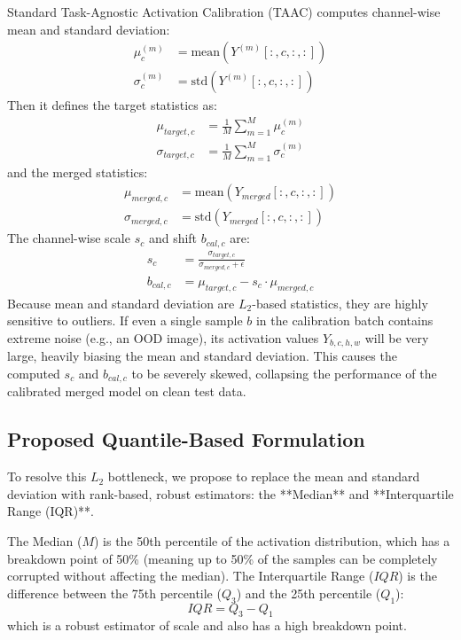 \documentclass{article}
\theoremstyle{plain}
\theoremstyle{definition}
\theoremstyle{remark}
\begin{document}
Standard Task-Agnostic Activation Calibration (TAAC) computes channel-wise mean and standard deviation:
\begin{align}
  \mu^{(m)}_c &= \text{mean}(Y^{(m)}[:, c, :, :]) \\
  \sigma^{(m)}_c &= \text{std}(Y^{(m)}[:, c, :, :])
\end{align}
Then it defines the target statistics as:
\begin{align}
  \mu_{target, c} &= \frac{1}{M} \sum_{m=1}^M \mu^{(m)}_c \\
  \sigma_{target, c} &= \frac{1}{M} \sum_{m=1}^M \sigma^{(m)}_c
\end{align}
and the merged statistics:
\begin{align}
  \mu_{merged, c} &= \text{mean}(Y_{merged}[:, c, :, :]) \\
  \sigma_{merged, c} &= \text{std}(Y_{merged}[:, c, :, :])
\end{align}
The channel-wise scale $s_c$ and shift $b_{cal, c}$ are:
\begin{align}
  s_c &= \frac{\sigma_{target, c}}{\sigma_{merged, c} + \epsilon} \\
  b_{cal, c} &= \mu_{target, c} - s_c \cdot \mu_{merged, c}
\end{align}
Because mean and standard deviation are $L_2$-based statistics, they are highly sensitive to outliers. If even a single sample $b$ in the calibration batch contains extreme noise (e.g., an OOD image), its activation values $Y_{b,c,h,w}$ will be very large, heavily biasing the mean and standard deviation. This causes the computed $s_c$ and $b_{cal, c}$ to be severely skewed, collapsing the performance of the calibrated merged model on clean test data.

\subsection{Proposed Quantile-Based Formulation}
To resolve this $L_2$ bottleneck, we propose to replace the mean and standard deviation with rank-based, robust estimators: the **Median** and **Interquartile Range (IQR)**. 

The Median ($M$) is the 50th percentile of the activation distribution, which has a breakdown point of 50\% (meaning up to 50\% of the samples can be completely corrupted without affecting the median).
The Interquartile Range ($IQR$) is the difference between the 75th percentile ($Q_3$) and the 25th percentile ($Q_1$):
\begin{equation}
  IQR = Q_3 - Q_1
\end{equation}
which is a robust estimator of scale and also has a high breakdown point.
\end{document}
